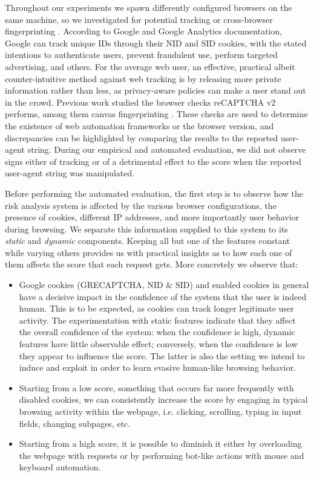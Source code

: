 Throughout our experiments we spawn differently configured browsers on the same machine, so we investigated for potential tracking or cross-browser fingerprinting \cite{boda2011user}.
According to Google and Google Analytics documentation, Google can track unique IDs through their NID and SID cookies, with the stated intentions to authenticate users, prevent fraudulent use, perform targeted advertising, and others.
For the average web user, an effective, practical albeit counter-intuitive method against web tracking is by releasing more private information rather than less, as privacy-aware policies can make a user stand out in the crowd.
Previous work \cite{sivakorn2016robot} studied the browser checks reCAPTCHA v2 performs, among them canvas fingerprinting \cite{mowery2012pixel}.
These checks are used to determine the existence of web automation frameworks or the browser version, and discrepancies can be highlighted by comparing the results to the reported user-agent string.
During our empirical and automated evaluation, we did not observe signs either of tracking or of a detrimental effect to the score when the reported user-agent string was manipulated.

Before performing the automated evaluation, the first step is to observe how the risk analysis system is affected by the various browser configurations, the presence of cookies, different IP addresses, and more importantly user behavior during browsing.
We separate this information supplied to this system to its \emph{static} and \emph{dynamic} components.
Keeping all but one of the features constant while varying others provides us with practical insights as to how each one of them affects the score that each request gets.
More concretely we observe that:

\begin{itemize}
  \item Google cookies (GRECAPTCHA, NID \& SID) and enabled cookies in general have a decisive impact in the confidence of the system that the user is indeed human. This is to be expected, as cookies can track longer legitimate user activity.
  The experimentation with static features indicate that they affect the overall confidence of the system: when the confidence is high, dynamic features have little observable effect; conversely, when the confidence is low they appear to influence the score.
  The latter is also the setting we intend to induce and exploit in order to learn evasive human-like browsing behavior.
  \item Starting from a low score, something that occurs far more frequently with disabled cookies, we can consistently increase the score by engaging in typical browsing activity within the webpage, i.e. clicking, scrolling, typing in input fields, changing subpages, etc.
  \item Starting from a high score, it is possible to diminish it either by overloading the webpage with requests or by performing bot-like actions with mouse and keyboard automation.
\end{itemize}

